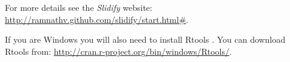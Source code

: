 \noindent For more details see the \emph{Slidify} website: \url{http://ramnathv.github.com/slidify/start.html#}.

If you are Windows you will also need to install Rtools \cite[]{Rtools}. You can download Rtools from: \url{http://cran.r-project.org/bin/windows/Rtools/}.\label{RtoolsDownload}



